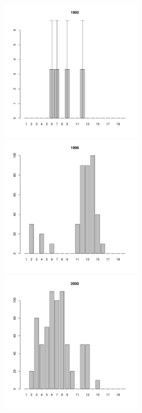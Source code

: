 \begin{figure}[h]

\begin{multicols}{3}
\hfill
\includegraphics[width=60mm]{../White_Sea/Luvenga_Goreliy/low_1992_.pdf}
\hfill
\includegraphics[width=60mm]{../White_Sea/Luvenga_Goreliy/low_1996_.pdf}
\hfill
\includegraphics[width=60mm]{../White_Sea/Luvenga_Goreliy/low_2000_.pdf}
\end{multicols}




\end{figure}
